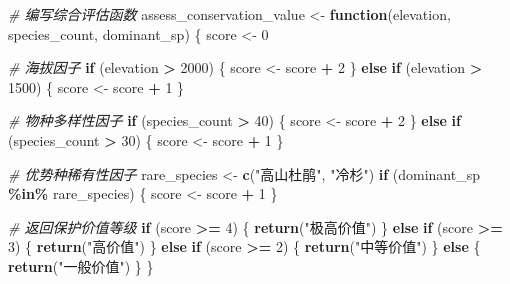 \documentclass[
  twoside]{book}
\newenvironment{Shaded}{\begin{snugshade}}{\end{snugshade}}
\newcommand{\CommentTok}[1]{\textcolor[rgb]{0.56,0.35,0.01}{\textit{#1}}}
\newcommand{\ControlFlowTok}[1]{\textcolor[rgb]{0.13,0.29,0.53}{\textbf{#1}}}
\newcommand{\DecValTok}[1]{\textcolor[rgb]{0.00,0.00,0.81}{#1}}
\newcommand{\FunctionTok}[1]{\textcolor[rgb]{0.13,0.29,0.53}{\textbf{#1}}}
\newcommand{\NormalTok}[1]{#1}
\newcommand{\OtherTok}[1]{\textcolor[rgb]{0.56,0.35,0.01}{#1}}
\newcommand{\SpecialCharTok}[1]{\textcolor[rgb]{0.81,0.36,0.00}{\textbf{#1}}}
\newcommand{\StringTok}[1]{\textcolor[rgb]{0.31,0.60,0.02}{#1}}
\begin{document}
\begin{Shaded}
\begin{Highlighting}[]
\CommentTok{\# 编写综合评估函数}
\NormalTok{assess\_conservation\_value }\OtherTok{\textless{}{-}} \ControlFlowTok{function}\NormalTok{(elevation, species\_count, dominant\_sp) \{}
\NormalTok{  score }\OtherTok{\textless{}{-}} \DecValTok{0}
  
  \CommentTok{\# 海拔因子}
  \ControlFlowTok{if}\NormalTok{ (elevation }\SpecialCharTok{\textgreater{}} \DecValTok{2000}\NormalTok{) \{}
\NormalTok{    score }\OtherTok{\textless{}{-}}\NormalTok{ score }\SpecialCharTok{+} \DecValTok{2}
\NormalTok{  \} }\ControlFlowTok{else} \ControlFlowTok{if}\NormalTok{ (elevation }\SpecialCharTok{\textgreater{}} \DecValTok{1500}\NormalTok{) \{}
\NormalTok{    score }\OtherTok{\textless{}{-}}\NormalTok{ score }\SpecialCharTok{+} \DecValTok{1}
\NormalTok{  \}}
  
  \CommentTok{\# 物种多样性因子}
  \ControlFlowTok{if}\NormalTok{ (species\_count }\SpecialCharTok{\textgreater{}} \DecValTok{40}\NormalTok{) \{}
\NormalTok{    score }\OtherTok{\textless{}{-}}\NormalTok{ score }\SpecialCharTok{+} \DecValTok{2}
\NormalTok{  \} }\ControlFlowTok{else} \ControlFlowTok{if}\NormalTok{ (species\_count }\SpecialCharTok{\textgreater{}} \DecValTok{30}\NormalTok{) \{}
\NormalTok{    score }\OtherTok{\textless{}{-}}\NormalTok{ score }\SpecialCharTok{+} \DecValTok{1}
\NormalTok{  \}}
  
  \CommentTok{\# 优势种稀有性因子}
\NormalTok{  rare\_species }\OtherTok{\textless{}{-}} \FunctionTok{c}\NormalTok{(}\StringTok{"高山杜鹃"}\NormalTok{, }\StringTok{"冷杉"}\NormalTok{)}
  \ControlFlowTok{if}\NormalTok{ (dominant\_sp }\SpecialCharTok{\%in\%}\NormalTok{ rare\_species) \{}
\NormalTok{    score }\OtherTok{\textless{}{-}}\NormalTok{ score }\SpecialCharTok{+} \DecValTok{1}
\NormalTok{  \}}
  
  \CommentTok{\# 返回保护价值等级}
  \ControlFlowTok{if}\NormalTok{ (score }\SpecialCharTok{\textgreater{}=} \DecValTok{4}\NormalTok{) \{}
    \FunctionTok{return}\NormalTok{(}\StringTok{"极高价值"}\NormalTok{)}
\NormalTok{  \} }\ControlFlowTok{else} \ControlFlowTok{if}\NormalTok{ (score }\SpecialCharTok{\textgreater{}=} \DecValTok{3}\NormalTok{) \{}
    \FunctionTok{return}\NormalTok{(}\StringTok{"高价值"}\NormalTok{)}
\NormalTok{  \} }\ControlFlowTok{else} \ControlFlowTok{if}\NormalTok{ (score }\SpecialCharTok{\textgreater{}=} \DecValTok{2}\NormalTok{) \{}
    \FunctionTok{return}\NormalTok{(}\StringTok{"中等价值"}\NormalTok{)}
\NormalTok{  \} }\ControlFlowTok{else}\NormalTok{ \{}
    \FunctionTok{return}\NormalTok{(}\StringTok{"一般价值"}\NormalTok{)}
\NormalTok{  \}}
\NormalTok{\}}


\end{Highlighting}
\end{Shaded}
\end{document}
